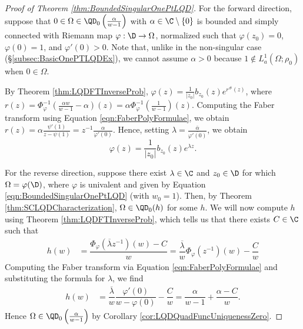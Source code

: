\documentclass{article}
\numberwithin{equation}{section}
\begin{document}
\begin{proof}[Proof of Theorem \ref{thm:BoundedSingularOnePtLQD}]\label{proof:BoundedSingularOnePtLQD}
For the forward direction, suppose that $0\in\Omega\in\QD_0\left(\frac{\alpha}{w-1}\right)$ with $\alpha\in\C\setminus\{0\}$ is bounded and simply connected with Riemann map $\varphi:\D\rightarrow\Omega$, normalized such that $\varphi(z_0)=0$, $\varphi(0)=1$, and $\varphi'(0)>0$. Note that, unlike in the non-singular case (\S\ref{subsec:BasicOnePTLQDEx}), we cannot assume $\alpha>0$ because $1\notin L^1_a(\Omega;\rho_0)$ when $0\in\Omega$.


By Theorem \ref{thm:LQDFTInverseProb}, $\varphi(z)=\frac{1}{|z_0|}b_{z_0}(z)e^{r^{\#}(z)}$, where $r(z)=\Phi_{\varphi}^{-1}\left(\frac{\alpha w}{w-1}-\alpha\right)(z)=\alpha\Phi_{\varphi}^{-1}\left(\frac{1}{w-1}\right)(z)$. Computing the Faber transform using Equation \ref{eqn:FaberPolyFormulae}, we obtain $r(z)=\alpha\frac{\psi'(1)}{z-\psi(1)}=z^{-1}\frac{\alpha}{\varphi'(0)}$. Hence, setting $\lambda=\frac{\overline{\alpha}}{\overline{\varphi'(0)}}$, we obtain
$$\varphi(z)=\frac{1}{|z_0|}b_{z_0}(z)e^{\lambda z}.$$

For the reverse direction, suppose there exist $\lambda\in\C$ and $z_0\in\D$ for which $\Omega=\varphi(\D)$, where $\varphi$ is univalent and given by Equation \ref{eqn:BoundedSingularOnePtLQD} (with $w_0=1$). Then, by Theorem \ref{thm:SCLQDCharacterization}, $\Omega\in\QD_0(h)$ for some $h$. We will now compute $h$ using Theorem \ref{thm:LQDFTInverseProb}, which tells us that there exists $C\in\C$ such that
\begin{align*}
h(w)&=\dfrac{\Phi_{\varphi}\left(\overline{\lambda}z^{-1}\right)(w)-C}{w}=\dfrac{\overline{\lambda}}{w}\Phi_{\varphi}\left(z^{-1}\right)(w)-\dfrac{C}{w}
\end{align*}
Computing the Faber transform via Equation \ref{eqn:FaberPolyFormulae} and substituting the formula for $\lambda$, we find
\begin{align*}
h(w)&=\dfrac{\overline{\lambda}}{w}\dfrac{\varphi'(0)}{w-\varphi(0)}-\dfrac{C}{w}=\dfrac{\alpha}{w-1}+\dfrac{\alpha-C}{w}.
\end{align*}
Hence $\Omega\in\QD_0\left(\frac{\alpha}{w-1}\right)$ by Corollary \ref{cor:LQDQuadFuncUniquenessZero}.


\end{proof}
\end{document}
